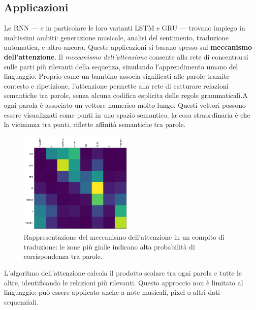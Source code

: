 \subsection{Applicazioni}
Le RNN — e in particolare le loro varianti LSTM e GRU — trovano impiego in moltissimi ambiti: generazione musicale, analisi del sentimento, traduzione automatica, e altro ancora. Queste applicazioni si basano spesso sul \textbf{meccanismo dell'attenzione}. Il \textit{meccanismo dell’attenzione} consente alla rete di concentrarsi sulle parti più rilevanti della sequenza, simulando l'apprendimento umano del linguaggio. Proprio come un bambino associa significati alle parole tramite contesto e ripetizione, l’attenzione permette alla rete di catturare relazioni semantiche tra parole, senza alcuna codifica esplicita delle regole grammaticali.A ogni parola è associato un vettore numerico molto lungo. Questi vettori possono essere visualizzati come punti in uno spazio semantico, la cosa straordinaria è che la vicinanza tra punti, riflette affinità semantiche tra parole.
\begin{figure}
    \centering
    \includegraphics[width=0.50\textwidth]{figure/AttentionEx.png}
    \caption{Rappresentazione del meccanismo dell'attenzione in un compito di traduzione: le zone più gialle indicano alta probabilità di corrispondenza tra parole.}
    \label{fig:AttEx}
\end{figure}
L'algoritmo dell'attenzione calcola il prodotto scalare tra ogni parola e tutte le altre, identificando le relazioni più rilevanti. Questo approccio non è limitato al linguaggio: può essere applicato anche a note musicali, pixel o altri dati sequenziali.

